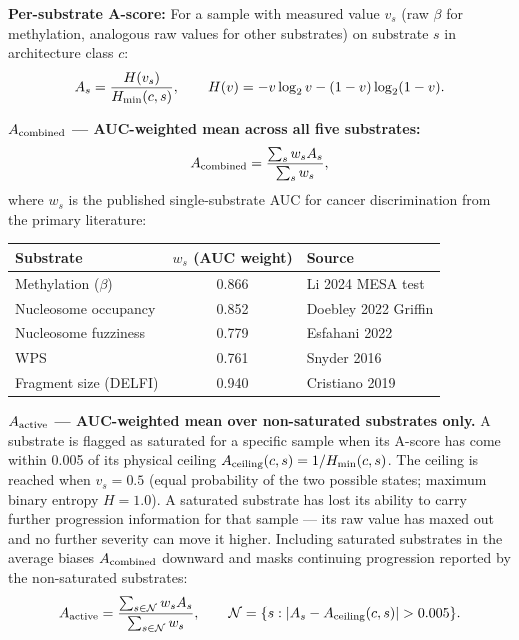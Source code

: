 \documentclass[12pt,a4paper]{article}
\begin{document}
\textbf{Per-substrate A-score:} For a sample with measured value $v_s$
(raw $\beta$ for methylation, analogous raw values for other substrates) on
substrate $s$ in architecture class $c$:
\begin{equation}
A_s = \frac{H(v_s)}{H_{\rm min}(c,s)},
\qquad
H(v) = -v\log_2 v - (1-v)\log_2(1-v).
\label{eq:A_sub}
\end{equation}

\textbf{$A_{\rm combined}$ --- AUC-weighted mean across all five substrates:}
\begin{equation}
A_{\rm combined} = \frac{\sum_{s} w_s A_s}{\sum_{s} w_s},
\label{eq:A_combined}
\end{equation}
where $w_s$ is the published single-substrate AUC for cancer discrimination
from the primary literature:
\begin{center}
\begin{tabular}{lcl}
\toprule
\textbf{Substrate} & \textbf{$w_s$ (AUC weight)} & \textbf{Source} \\
\midrule
Methylation ($\beta$) & 0.866 & Li 2024 MESA test \\
Nucleosome occupancy & 0.852 & Doebley 2022 Griffin \\
Nucleosome fuzziness & 0.779 & Esfahani 2022 \\
WPS & 0.761 & Snyder 2016 \\
Fragment size (DELFI) & 0.940 & Cristiano 2019 \\
\bottomrule
\end{tabular}
\end{center}

\textbf{$A_{\rm active}$ --- AUC-weighted mean over non-saturated substrates
only.} A substrate is flagged as saturated for a specific sample when its
A-score has come within 0.005 of its physical ceiling
$A_{\rm ceiling}(c,s) = 1/H_{\rm min}(c,s)$. The ceiling is reached when
$v_s = 0.5$ (equal probability of the two possible states; maximum binary
entropy $H = 1.0$). A saturated substrate has lost its ability to carry further
progression information for that sample --- its raw value has maxed out and no
further severity can move it higher. Including saturated substrates in the
average biases $A_{\rm combined}$ downward and masks continuing progression
reported by the non-saturated substrates:
\begin{equation}
A_{\rm active} = \frac{\sum_{s \in \mathcal{N}} w_s A_s}{\sum_{s \in \mathcal{N}} w_s},
\qquad
\mathcal{N} = \{s : |A_s - A_{\rm ceiling}(c,s)| > 0.005\}.
\label{eq:A_active}
\end{equation}
\end{document}

